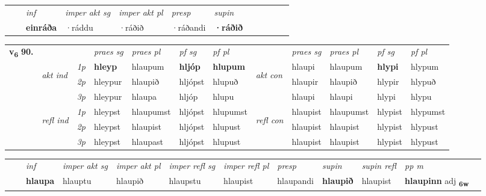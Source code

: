\begin{tabular}{llllllllllll}
 & & \textit{inf} & \textit{imper akt sg} & \textit{imper akt pl}   & \textit{presp} & \textit{supin}       \\*
  & & \textbf{einráða} & ·ráddu  & ·ráðið   & ·ráðandi &  \textbf{·ráðið}   \\*
\cmidrule{1-12}
\end{tabular}



\begin{tabular}{llllllllllll} \toprule
\multirow{4}{*}{{{\textbf{v{\textsubscript{6}}} \Large{\textbf{90.}}}}}  & &   &  \textit{praes sg}  & \textit{praes pl}  &\textit{ pf sg} & \textit{pf pl} &  &  \textit{praes sg}  & \textit{praes pl}  & \textit{pf sg} & \textit{pf pl } \\*
	\cmidrule{4-7} \cmidrule{9-12}
 & \multirow{3}{*}{\begin{turn}{90}\textit{akt ind}\end{turn}} & {\textit{1p}} & \textbf{hleyp} & hlaupum    & \textbf{hljóp} & \textbf{hlupum} & \multirow{3}{*}{\begin{turn}{90}\textit{akt con}\end{turn}} &hlaupi & hlaupum & \textbf{hlypi} & hlypum\\*
& &  {\textit{2p}} &  hleypur  & hlaupið   & hljópst & hlupuð & & hlaupir & hlaupið & hlypir & hlypuð \\*
& &  {\textit{3p}} & hleypur & hlaupa   & hljóp & hlupu & & hlaupi & hlaupi& hlypi & hlypu  \\*
\cmidrule{4-7} \cmidrule{9-12}
 &\multirow{3}{*}{\begin{turn}{90}\textit{refl ind}\end{turn}} & {\textit{1p}} & hleypst & hlaupumst    & hljópst & hlupumst & \multirow{3}{*}{\begin{turn}{90}\textit{refl con}\end{turn}}  &hlaupist & hlaupumst & hlypist & hlypumst\\*
 &&  {\textit{2p}} &  hleypst  & hlaupist   & hljópst & hlupust & &hlaupist & hlaupist & hlypist & hlypust \\*
& &  {\textit{3p}} & hleypst & hlaupast   & hljópst & hlupust & & hlaupist & hlaupist& hlypist & hlypust  \\*
\cmidrule{4-7} \cmidrule{9-12}
\end{tabular}


\begin{tabular}{llllllllllll}
 & & \textit{inf} & \textit{imper akt sg} & \textit{imper akt pl} & \textit{imper refl sg} & \textit{imper refl pl} & \textit{presp} & \textit{supin} & \textit{supin refl} & \textit{pp m}     \\*
  & & \textbf{hlaupa} & hlauptu  & hlaupið & hlaupstu & hlaupist & hlaupandi &  \textbf{hlaupið} & hlaupist & \textbf{hlaupinn} adj \textbf{\textsubscript{6w}} \\*
\cmidrule{1-12}
\end{tabular}



